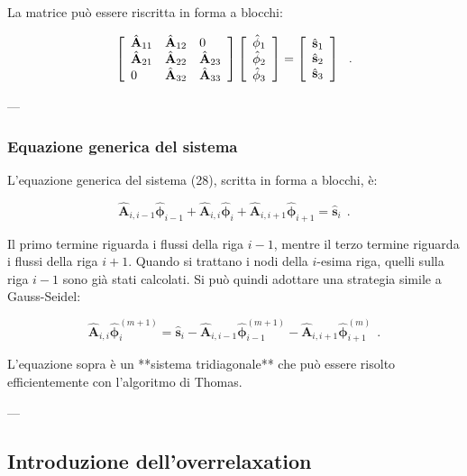 La matrice può essere riscritta in forma a blocchi:

\[
\left[ \begin{array}{l l l}
	\hat{\mathbf{A}}_{11} & \hat{\mathbf{A}}_{12} & 0 \\
	\hat{\mathbf{A}}_{21} & \hat{\mathbf{A}}_{22} & \hat{\mathbf{A}}_{23} \\
	0 & \hat{\mathbf{A}}_{32} & \hat{\mathbf{A}}_{33}
\end{array} \right]
\left[ \begin{array}{l}
	\hat{\mathbf{\phi}}_1 \\ \hat{\mathbf{\phi}}_2 \\ \hat{\mathbf{\phi}}_3
\end{array} \right]
=
\left[ \begin{array}{l}
	\hat{\mathbf{s}}_1 \\ \hat{\mathbf{s}}_2 \\ \hat{\mathbf{s}}_3
\end{array} \right]\ \ . 
\]

---

\subsubsection{Equazione generica del sistema}

L'equazione generica del sistema (28), scritta in forma a blocchi, è:

\[
\hat{\mathbf{A}}_{i,i-1} \hat{\mathbf{\phi}}_{i-1} + \hat{\mathbf{A}}_{i,i} \hat{\mathbf{\phi}}_i + \hat{\mathbf{A}}_{i,i+1} \hat{\mathbf{\phi}}_{i+1} = \hat{\mathbf{s}}_i\ \ . 
\]

Il primo termine riguarda i flussi della riga \(i-1\), mentre il terzo termine riguarda i flussi della riga \(i+1\). Quando si trattano i nodi della \(i\)-esima riga, quelli sulla riga \(i-1\) sono già stati calcolati. Si può quindi adottare una strategia simile a Gauss-Seidel:

\[
\hat{\mathbf{A}}_{i,i} \hat{\mathbf{\phi}}_i^{(m+1)} = \hat{\mathbf{s}}_i - \hat{\mathbf{A}}_{i,i-1} \hat{\mathbf{\phi}}_{i-1}^{(m+1)} - \hat{\mathbf{A}}_{i,i+1} \hat{\mathbf{\phi}}_{i+1}^{(m)}\ \ . 
\]

L'equazione sopra è un **sistema tridiagonale** che può essere risolto efficientemente con l'algoritmo di Thomas.

---

\subsection*{Introduzione dell'overrelaxation}

